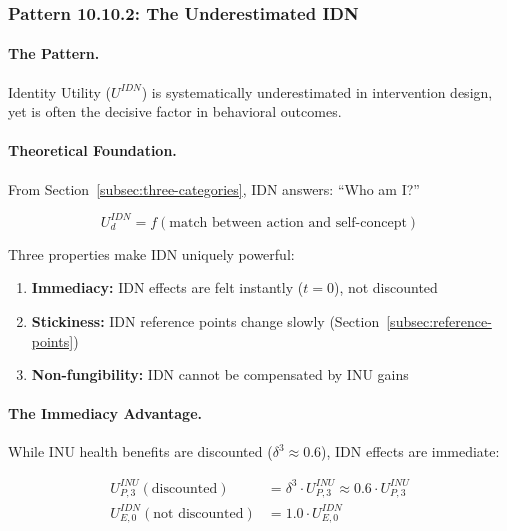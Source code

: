 \subsubsection{Pattern 10.10.2: The Underestimated IDN}
\label{subsubsec:underestimated-idn}

\paragraph{The Pattern.}
Identity Utility ($U^{IDN}$) is systematically underestimated in intervention 
design, yet is often the decisive factor in behavioral outcomes.

\paragraph{Theoretical Foundation.}
From Section~\ref{subsec:three-categories}, IDN answers: ``Who am I?''

\begin{equation}
U^{IDN}_d = f(\text{match between action and self-concept})
\end{equation}

Three properties make IDN uniquely powerful:

\begin{enumerate}
\item \textbf{Immediacy:} IDN effects are felt instantly ($t=0$), not discounted
\item \textbf{Stickiness:} IDN reference points change slowly (Section~\ref{subsec:reference-points})
\item \textbf{Non-fungibility:} IDN cannot be compensated by INU gains
\end{enumerate}

\paragraph{The Immediacy Advantage.}
While INU health benefits are discounted ($\delta^3 \approx 0.6$), 
IDN effects are immediate:

\begin{align}
U^{INU}_{P,3}(\text{discounted}) &= \delta^3 \cdot U^{INU}_{P,3} \approx 0.6 \cdot U^{INU}_{P,3} \\
U^{IDN}_{E,0}(\text{not discounted}) &= 1.0 \cdot U^{IDN}_{E,0}
\end{align}

